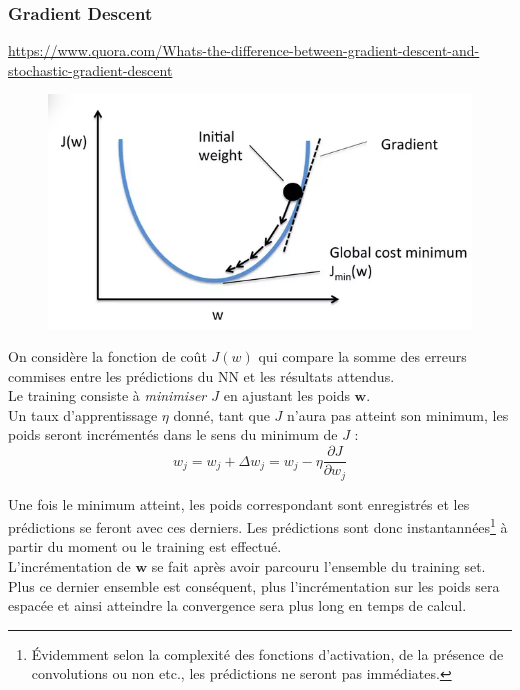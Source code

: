 \documentclass[a4paper,12pt]{report}
\numberwithin{equation}{section} %
\begin{document}
\subsubsection*{Gradient Descent}
\noindent \footnotesize{\url{https://www.quora.com/Whats-the-difference-between-gradient-descent-and-stochastic-gradient-descent} } \normalsize

\begin{figure} 
\vspace{-15pt}
\centering
\includegraphics[scale=0.5]{GD_climb.png}
\end{figure}

\noindent On considère la fonction de coût $J(w)$ qui compare la somme des erreurs commises entre les prédictions du NN et les résultats attendus.\\
Le training consiste à \textit{minimiser $J$} en ajustant les poids $\textbf{w}$. \\ Un taux d'apprentissage $\eta$ donné, tant que $J$ n'aura pas atteint son minimum, les poids seront incrémentés dans le sens du minimum de $J$ :
$$w_j = w_j + \Delta w_j = w_j - \eta \frac{\partial J }{\partial w_j} $$ 

\noindent Une fois le minimum atteint, les poids correspondant sont enregistrés et les prédictions se feront avec ces derniers. Les prédictions sont donc instantannées\footnote{Évidemment selon la complexité des fonctions d'activation, de la présence de convolutions ou non etc., les prédictions ne seront pas immédiates. } à partir du moment ou le training est effectué.\\
L'incrémentation de $\textbf{w}$ se fait après avoir parcouru l'ensemble du training set. Plus ce dernier ensemble est conséquent, plus l'incrémentation sur les poids sera espacée et ainsi atteindre la convergence sera plus long en temps de calcul.
\end{document}
